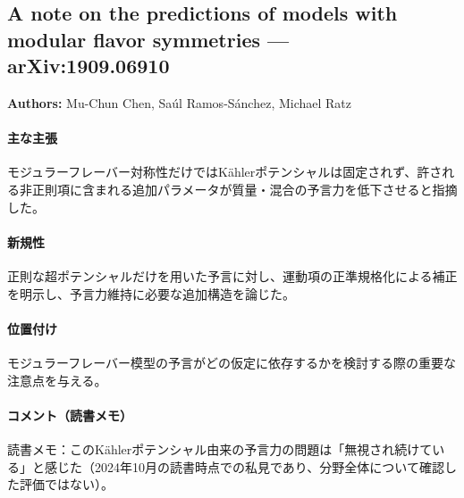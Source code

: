 \subsection{A note on the predictions of models with modular flavor symmetries --- arXiv:1909.06910}

\textbf{Authors:} Mu-Chun Chen, Sa{\'u}l Ramos-S{\'a}nchez, Michael Ratz

\paragraph{主な主張}
モジュラーフレーバー対称性だけではK\"ahlerポテンシャルは固定されず、許される非正則項に含まれる追加パラメータが質量・混合の予言力を低下させると指摘した\cite{Chen:2019ewa}。

\paragraph{新規性}
正則な超ポテンシャルだけを用いた予言に対し、運動項の正準規格化による補正を明示し、予言力維持に必要な追加構造を論じた。

\paragraph{位置付け}
モジュラーフレーバー模型の予言がどの仮定に依存するかを検討する際の重要な注意点を与える。

\paragraph{コメント（読書メモ）}
読書メモ：このK\"ahlerポテンシャル由来の予言力の問題は「無視され続けている」と感じた（2024年10月の読書時点での私見であり、分野全体について確認した評価ではない）。
